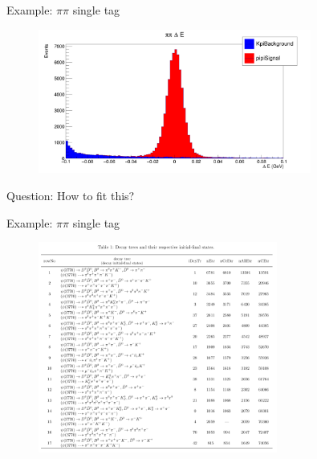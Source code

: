 \documentclass{beamer}
\begin{document}
\begin{frame}{Example: $\pi\pi$ single tag}
  \begin{figure}
    \centering
    \includegraphics[width=0.8\textwidth]{pipiDeltaEBackground.png}
  \end{figure}
  Question: How to fit this?
\end{frame}

\begin{frame}{Example: $\pi\pi$ single tag}
  \begin{figure}
    \centering
    \includegraphics[width=0.7\textwidth]{pipiDecayTree.png}
  \end{figure}
\end{frame}
\end{document}
